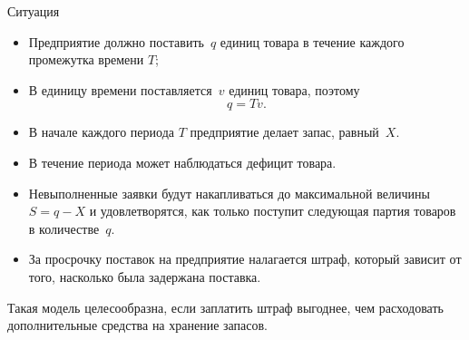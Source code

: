 \documentclass[unicode,11pt,notheorems,xcolor=table]{beamer}
\begin{document}
\begin{frame}{Ситуация}
    \begin{itemize}
        \item  Предприятие должно поставить~$q$ единиц товара в течение каждого промежутка времени $T$; 
        \item  В единицу времени поставляется~$v$ единиц товара, поэтому
        $$
            q=Tv.
        $$
        \item  В начале каждого периода $T$ предприятие делает запас, равный~$X$. 
        \item В течение периода может наблюдаться дефицит товара.
        \item  Невыполненные заявки будут накапливаться до максимальной величины $S=q-X$ и удовлетворятся, как только поступит следующая партия товаров в количестве~$q$.
        \item За просрочку поставок на предприятие налагается штраф, который зависит от того, насколько была задержана поставка. 
    \end{itemize}

    \pause
    \begin{block}{}    
        Такая модель целесообразна, если заплатить штраф выгоднее, чем расходовать дополнительные средства на хранение запасов.
    \end{block}
\end{frame}
\end{document}
